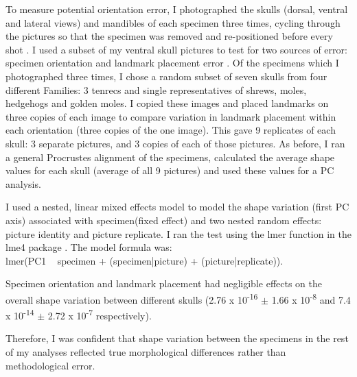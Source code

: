 	To measure potential orientation error, I photographed the skulls (dorsal, ventral and lateral views) and mandibles of each specimen three times, cycling through the pictures so that the specimen was removed and re-positioned before every shot \citep{Viscosi2011}.
	I used a subset of my ventral skull pictures to test for two sources of error: specimen orientation and landmark placement error \citep{Arnqvist1998, Barrow2008}. Of the specimens which I photographed three times,  I chose a random subset of seven skulls from four different Families: 3 tenrecs and single representatives of shrews, moles, hedgehogs and golden moles. I copied these images and placed landmarks on three copies of each image to compare variation in landmark placement within each orientation (three copies of the one image). This gave 9 replicates of each skull: 3 separate pictures, and 3 copies of each of those pictures. As before, I ran a general Procrustes alignment \citep{Rohlf1993} of the specimens, calculated the average shape values for each skull (average of all 9 pictures) and used these values for a PC analysis. 
		
	I used a nested, linear mixed effects model to model the shape variation (first PC axis) associated with specimen(fixed effect) and two nested random effects: picture identity and picture replicate. I ran the test using the lmer function in the lme4 package \citep{Bates2014}. The model formula was:\\ 
	lmer(PC1 ~ specimen + (specimen|picture) + (picture|replicate)).

	
	Specimen orientation and landmark placement had negligible effects on the overall shape variation between different skulls (2.76 x 10\textsuperscript{-16} $\pm$ 1.66 x 10\textsuperscript{-8} and 7.4 x 10\textsuperscript{-14} $\pm$ 2.72 x 10\textsuperscript{-7} respectively). 
	
	Therefore, I was confident that shape variation between the specimens in the rest of my analyses reflected true morphological differences rather than methodological error.







